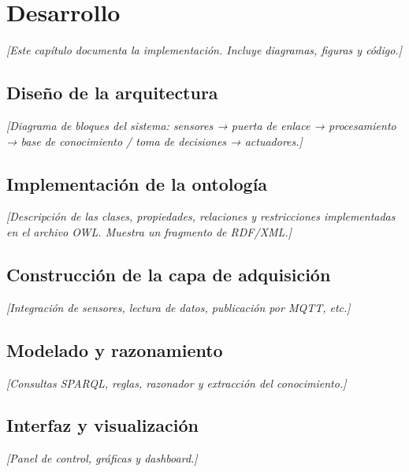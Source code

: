 
\chapter{Desarrollo}
\label{cap:desarrollo}

\textit{[Este capítulo documenta la implementación. Incluye diagramas, figuras y código.]}

\section{Diseño de la arquitectura}
\label{sec:arquitectura}

\textit{[Diagrama de bloques del sistema: sensores → puerta de enlace → procesamiento →
base de conocimiento / toma de decisiones → actuadores.]}

\section{Implementación de la ontología}
\label{sec:implementacion-ontologia}

\textit{[Descripción de las clases, propiedades, relaciones y restricciones implementadas
en el archivo OWL. Muestra un fragmento de RDF/XML.]}

\section{Construcción de la capa de adquisición}
\label{sec:adquisicion}

\textit{[Integración de sensores, lectura de datos, publicación por MQTT, etc.]}

\section{Modelado y razonamiento}
\label{sec:razonamiento}

\textit{[Consultas SPARQL, reglas, razonador y extracción del conocimiento.]}

\section{Interfaz y visualización}
\label{sec:interfaz}

\textit{[Panel de control, gráficas y dashboard.]}
